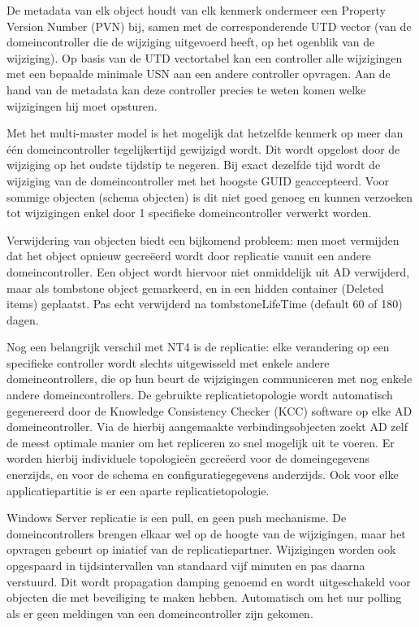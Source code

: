 De metadata van elk object houdt van elk kenmerk ondermeer een Property Version
Number (PVN) bij, samen met de corresponderende UTD vector (van de
domeincontroller die de wijziging uitgevoerd heeft, op het ogenblik van de
wijziging). Op basis van de UTD vectortabel kan een controller alle wijzigingen
met een bepaalde minimale USN aan een andere controller opvragen. Aan de hand
van de metadata kan deze controller precies te weten komen welke wijzigingen hij
moet opsturen.

Met het multi-master model is het mogelijk dat hetzelfde kenmerk op meer dan één
domeincontroller tegelijkertijd gewijzigd wordt. Dit wordt opgelost door de
wijziging op het oudste tijdstip te negeren. Bij exact dezelfde tijd wordt de
wijziging van de domeincontroller met het hoogste GUID geaccepteerd. Voor
sommige objecten (schema objecten) is dit niet goed genoeg en kunnen verzoeken
tot wijzigingen enkel door 1 specifieke domeincontroller verwerkt worden.

Verwijdering van objecten biedt een bijkomend probleem: men moet vermijden dat
het object opnieuw gecreëerd wordt door replicatie vanuit een andere
domeincontroller. Een object wordt hiervoor niet onmiddelijk uit AD verwijderd,
maar als tombstone object gemarkeerd, en in een hidden container (Deleted items)
geplaatst. Pas echt verwijderd na tombstoneLifeTime (default 60 of 180) dagen.

Nog een belangrijk verschil met NT4 is de  replicatie:
elke verandering op een specifieke controller wordt slechts uitgewisseld met
enkele andere domeincontrollers, die op hun beurt de wijzigingen communiceren
met nog enkele andere domeincontrollers. De gebruikte replicatietopologie wordt
automatisch gegenereerd door de Knowledge Consistency Checker (KCC) software op
elke AD domeincontroller. Via de hierbij aangemaakte verbindingsobjecten zoekt
AD zelf de meest optimale manier om het repliceren zo snel mogelijk uit te
voeren. Er worden hierbij individuele topologieën gecreëerd voor de
domeingegevens enerzijds, en voor de schema en configuratiegegevens anderzijds.
Ook voor elke applicatiepartitie is er een aparte replicatietopologie.

Windows Server replicatie is een pull, en geen push mechanisme. De
domeincontrollers brengen elkaar wel op de hoogte van de wijzigingen, maar het
opvragen gebeurt op iniatief van de replicatiepartner. Wijzigingen worden ook
opgespaard in tijdsintervallen van standaard vijf minuten en pas daarna
verstuurd. Dit wordt propagation damping genoemd en wordt uitgeschakeld voor
objecten die met beveiliging te maken hebben. Automatisch om het uur polling als
er geen meldingen van een domeincontroller zijn gekomen.

